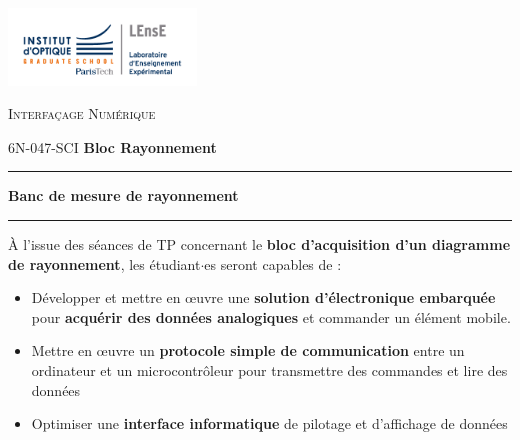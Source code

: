 \documentclass[a4paper,11pt,titlepage]{article} %
\begin{document}
\newpage
\strut %


\newpage
\pagestyle{empty}

\begin{minipage}[c]{.25\linewidth}
	\includegraphics[width=5cm]{images/Logo-LEnsE.png}
\end{minipage} \hfill
\begin{minipage}[c]{.4\linewidth}

\begin{center}
\vspace{0.3cm}
{\Large \textsc{Interfaçage Numérique}}

\medskip

6N-047-SCI \qquad \textbf{\large Bloc Rayonnement}

\end{center}
\end{minipage}\hfill

\vspace{0.5cm}

\noindent \rule{\linewidth}{1pt}

{\noindent\Large  \rule[-7pt]{0pt}{30pt} \textbf{Banc de mesure de rayonnement}}

\noindent \rule{\linewidth}{1pt}

\bigskip 


{\large À l'issue des séances de TP concernant le \textbf{bloc d'acquisition d'un diagramme de rayonnement}, les étudiant$\cdot$es seront capables de :}

\medskip

\begin{itemize}
	\item Développer et mettre en \oe{}uvre une \textbf{solution d'électronique embarquée} pour \textbf{acquérir des données analogiques} et commander un élément mobile.
	\item Mettre en \oe{}uvre un \textbf{protocole simple de communication} entre un ordinateur et un microcontrôleur pour transmettre des commandes et lire des données
	\item Optimiser une \textbf{interface informatique} de pilotage et d'affichage de données
\end{itemize}
\end{document}

